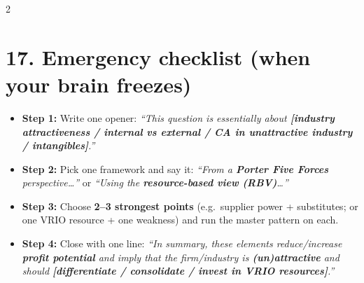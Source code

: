 \documentclass[8pt,landscape,a4paper]{article}
\begin{document}
\begin{multicols}{2}
\section*{\color{eublue}17. Emergency checklist (when your brain freezes)}
\begin{itemize}
\item \textbf{Step 1:} Write one opener: \emph{``This question is essentially about \textbf{[industry attractiveness / internal vs external / CA in unattractive industry / intangibles]}.''}
\item \textbf{Step 2:} Pick one framework and say it: \emph{``From a \textbf{Porter Five Forces} perspective\ldots''} or \emph{``Using the \textbf{resource-based view (RBV)}\ldots''}
\item \textbf{Step 3:} Choose \textbf{2--3 strongest points} (e.g.\ supplier power + substitutes; or one VRIO resource + one weakness) and run the master pattern on each.
\item \textbf{Step 4:} Close with one line: \emph{``In summary, these elements reduce/increase \textbf{profit potential} and imply that the firm/industry is \textbf{(un)attractive} and should \textbf{[differentiate / consolidate / invest in VRIO resources]}.''}
\end{itemize}

\end{multicols}
\end{document}
